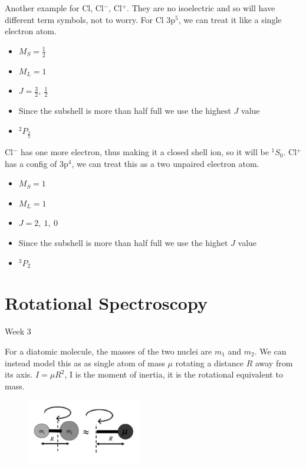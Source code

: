 \documentclass{article}
\newcommand{\thedate}[1]{\hfill{\small\sc #1}}
\begin{document}
    Another example for Cl, Cl$^{-}$, Cl$^+$. They are no isoelectric and so will have different term symbols,
    not to worry. For Cl 3p$^{5}$, we can treat it like a single electron atom.
    \begin{itemize}
        \item $M_S = \frac{1}{2}$
        \item $M_L = 1$
        \item $J = \frac{3}{2},\ \frac{1}{2}$
        \item Since the subshell is more than half full we use the highest $J$ value
        \item $^2P_\frac{3}{2}$
    \end{itemize}
    Cl$^{-}$ has one more electron, thus making it a closed shell ion, so it will be $^1S_0$. 
    Cl$^{+}$ has a config of 3p$^4$, we can treat this as a two unpaired electron atom.
    \begin{itemize}
        \item $M_S = 1$
        \item $M_L = 1$
        \item $J = 2,\ 1,\ 0$
        \item Since the subshell is more than half full we use the highet $J$ value
        \item $^3P_2$
    \end{itemize}

    \section{Rotational Spectroscopy}\thedate{Week 3}

    For a diatomic molecule, the masses of the two nuclei are $m_1$ and $m_2$. We can instead model this as
    as single atom of mass $\mu$ rotating a distance $R$ away from its axis. $I = \mu R^2$, I is the moment of 
    inertia, it is the rotational equivalent to mass.

    \begin{figure}[h]
        \begin{center}
            \includegraphics[width=5cm]{rotat.jpg}
        \end{center}
    \end{figure}
\end{document}
